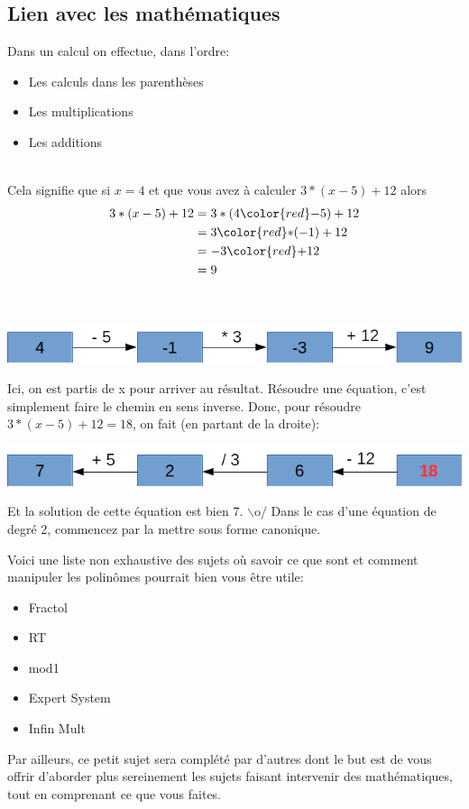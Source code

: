 \documentclass{42}
\begin{document}
\newpage

\subsection{Lien avec les mathématiques}

\begin{flushleft}
Dans un calcul on effectue, dans l'ordre:
\newline
\begin{itemize}
	\item Les calculs dans les parenthèses
	\item Les multiplications
	\item Les additions
\end{itemize}
~\\
Cela signifie que si $x = 4$ et que vous avez à calculer $3 * (x - 5) + 12$ alors
\begin{align}
	3 * (x - 5) + 12	&= 3 * (4 {\color{red} - } 5) + 12 \\
					&= 3 {\color{red} * } (-1) + 12 \\
					&= -3 {\color{red}+} 12 \\
					&= 9
\end{align}
\end{flushleft}
~\\
\begin{center}
\includegraphics[scale=0.8]{illustration_resolution_equation.png}
\end{center}
Ici, on est partis de x pour arriver au résultat. Résoudre une équation, c'est simplement faire le chemin en sens inverse. \newline \newline
Donc, pour résoudre $3 * (x - 5) + 12 = 18$, on fait (en partant de la droite):
\begin{center}
\includegraphics[scale=0.8]{illustration_resolution_equation_rev.png}
\end{center}
Et la solution de cette équation est bien 7. $\backslash$o/
\hint
{
	Dans le cas d'une équation de degré 2, commencez par la mettre sous forme canonique.
}

\info
{
Voici une liste non exhaustive des sujets où savoir ce que sont et comment manipuler les polinômes pourrait bien vous être utile:
	\begin{itemize}
	\item Fractol
	\item RT
	\item mod1
	\item Expert System
	\item Infin Mult
\end{itemize}

Par ailleurs, ce petit sujet sera complété par d'autres dont le but est de vous offrir d'aborder plus sereinement les sujets faisant intervenir des mathématiques, tout en comprenant ce que vous faites.
}
\end{document}
